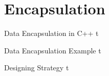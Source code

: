 \documentclass[../lecture5-objectorientation.tex]{subfiles}
\begin{document}
\section{Encapsulation}


\begin{frame}[fragile]{Data Encapsulation in C++}
t
\end{frame}


\begin{frame}[fragile]{Data Encapsulation Example}
t
\end{frame}


\begin{frame}[fragile]{Designing Strategy}
t
\end{frame}

\end{document}
